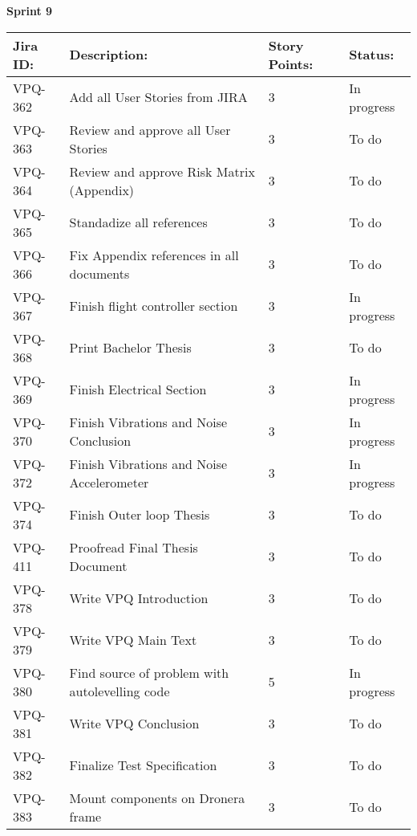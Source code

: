 \begin{table}[ht]
\centering\textbf{Sprint 9}
\begin{tabularx}{\linewidth}{|m{1.5cm} m{8.3cm} m{1.5cm} m{3.5cm}|}
\hline
    \rowcolor{cadetgrey} 
     \textbf{Jira ID:} & \textbf{Description:} &  \textbf{Story Points:} & \textbf{Status: } \\ \hline
      VPQ-362 & Add all User Stories from JIRA & 3\centering & In progress  \\ 
\rowcolor{gainsboro} VPQ-363 &  Review and approve all User Stories & 3\centering & To do  \\
      VPQ-364 & Review and approve Risk Matrix (Appendix) & 3\centering & To do \\
\rowcolor{gainsboro} VPQ-365 & Standadize all references & 3\centering & To do  \\
      VPQ-366 & Fix Appendix references in all documents & 3\centering & To do  \\
\rowcolor{gainsboro} VPQ-367 & Finish flight controller section & 3\centering & In progress  \\
      VPQ-368 & Print Bachelor Thesis & 3\centering & To do  \\
\rowcolor{gainsboro} VPQ-369 & Finish Electrical Section & 3\centering & In progress  \\    
      VPQ-370 & Finish Vibrations and Noise Conclusion & 3\centering & In progress  \\
\rowcolor{gainsboro}  VPQ-372 & Finish Vibrations and Noise Accelerometer & 3\centering & In progress  \\
      VPQ-374 & Finish Outer loop Thesis & 3\centering & To do  \\
\rowcolor{gainsboro}  VPQ-411 & Proofread Final Thesis Document & 3\centering & To do  \\
      VPQ-378 & Write VPQ Introduction & 3\centering & To do  \\
\rowcolor{gainsboro}  VPQ-379 & Write VPQ Main Text & 3\centering & To do  \\
      VPQ-380 & Find source of problem with autolevelling code & 5\centering & In progress  \\
\rowcolor{gainsboro}  VPQ-381 & Write VPQ Conclusion & 3\centering & To do  \\
      VPQ-382 & Finalize Test Specification & 3\centering & To do  \\
\rowcolor{gainsboro}  VPQ-383 & Mount components on Dronera frame & 3\centering & To do  \\

\end{tabularx}
\end{table}
